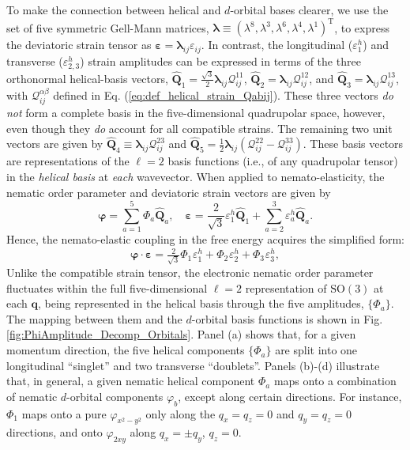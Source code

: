 \documentclass[aps,prb, twocolumn, superscriptaddress, amsmath, amsfonts, amssymb, amsthm]{revtex4-2}
\renewcommand{\eqref}[1]{Eq. (\ref{#1})}
\begin{document}
To make the connection between helical and $d$-orbital bases clearer, we use the set of five symmetric Gell-Mann matrices, $\boldsymbol{\lambda}\equiv\left(\lambda^{8},\lambda^{3},\lambda^{6},\lambda^{4},\lambda^{1}\right)^{\text{T}}$, to express the deviatoric strain tensor as $\boldsymbol{\varepsilon} = \boldsymbol{\lambda}_{ij}\varepsilon_{ij}$. In contrast, the longitudinal ($\varepsilon^h_1$)  and transverse ($\varepsilon^h_{2,3}$) strain amplitudes can be expressed in terms of the three orthonormal helical-basis vectors, $\boldsymbol{\hat{Q}}_1 = \frac{\sqrt{3}}{2} \boldsymbol{\lambda}_{ij}\mathcal{Q}_{ij}^{11}$, $\boldsymbol{\hat{Q}}_2 = \boldsymbol{\lambda}_{ij}\mathcal{Q}_{ij}^{12}$, and $\boldsymbol{\hat{Q}}_3 = \boldsymbol{\lambda}_{ij}\mathcal{Q}_{ij}^{13}$, with $\mathcal{Q}_{ij}^{\alpha\beta}$  defined in \eqref{eq:def_helical_strain_Qabij}.  These three vectors \textit{do not} form a complete basis in the five-dimensional quadrupolar space, however, even though they \textit{do} account for all compatible strains. The remaining two unit vectors are given by $\boldsymbol{\hat{Q}}_4 \equiv \boldsymbol{\lambda}_{ij}\mathcal{Q}_{ij}^{23}$  and $\boldsymbol{\hat{Q}}_5 = \frac{1}{2} \boldsymbol{\lambda}_{ij}(\mathcal{Q}_{ij}^{22} - \mathcal{Q}_{ij}^{33})$. These basis vectors are representations of the $\ell = 2$ basis functions (i.e., of any quadrupolar tensor) in the \textit{helical basis} at \textit{each} wavevector. When applied to nemato-elasticity, the nematic order parameter and deviatoric strain vectors are given by
\begin{equation}
    \boldsymbol{\varphi} = \sum_{a = 1}^5 \Phi_a \boldsymbol{\hat{Q}}_a, \quad \boldsymbol{\varepsilon} = \frac{2}{\sqrt{3}}\varepsilon^h_1 \boldsymbol{\hat{Q}}_1 + \sum_{a = 2}^3 \varepsilon^h_a \boldsymbol{\hat{Q}}_a.
\end{equation}
Hence, the nemato-elastic coupling in the free energy acquires the simplified form:
\begin{equation}
    \boldsymbol{\varphi}\cdot \boldsymbol{\varepsilon} = \tfrac{2}{\sqrt{3}}\Phi_{1}^{\phantom{h}}\varepsilon_{1}^{h}+\Phi_{2}^{\phantom{h}}\varepsilon_{2}^{h}+\Phi_{3}^{\phantom{h}}\varepsilon_{3}^{h}, \label{eq:iso_nematoelastic_bilinear}
\end{equation}
Unlike the compatible strain tensor, the electronic nematic order parameter fluctuates within the full five-dimensional $\ell = 2$ representation of $\text{SO}(3)$ at each $\boldsymbol{q}$,  being represented in the helical basis through the five amplitudes, $\{ \Phi_a\}$. The mapping between them and the $d$-orbital basis functions is shown in Fig. \ref{fig:PhiAmplitude_Decomp_Orbitals}. Panel (a) shows that, for a given momentum direction, the five helical components $\{ \Phi_a\}$ are split into one longitudinal ``singlet'' and two transverse ``doublets''. Panels (b)-(d) illustrate that, in general, a given nematic helical component $\Phi_a$ maps onto a combination of nematic $d$-orbital components $\varphi_b$, except along certain directions. For instance, $\Phi_1$ maps onto a pure $\varphi_{x^2-y^2}$ only along the $q_x=q_z=0$ and $q_y=q_z=0$ directions, and onto $\varphi_{2xy}$ along $q_x=\pm q_y$, $q_z=0$.
\end{document}
